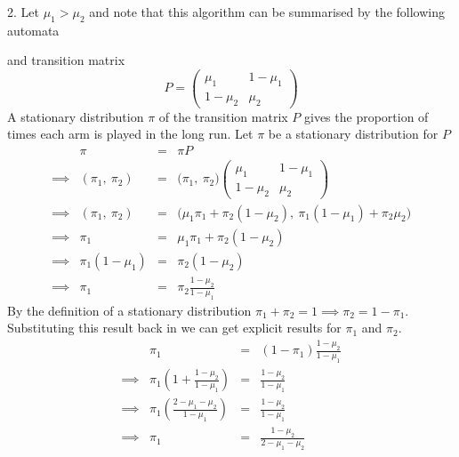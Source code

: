 \documentclass[11pt,a4paper]{article}
\begin{document}
\begin{answer}{2.}
  Let $\mu_1>\mu_2$ and note that this algorithm can be summarised by the following automata
  \begin{center}
  \end{center}
  and transition matrix
  \[ P=\begin{pmatrix}\mu_1&1-\mu_1\\1-\mu_2&\mu_2\end{pmatrix} \]
  A stationary distribution $\pi$ of the transition matrix $P$ gives the proportion of times each arm is played in the long run. Let $\pi$ be a stationary distribution for $P$
  \[\begin{array}{rrcl}
    &\pi&=&\pi P\\
    \implies&(\pi_1,\ \pi_2)&=&\big(\pi_1,\ \pi_2\big)\begin{pmatrix}\mu_1&1-\mu_1\\1-\mu_2&\mu_2\end{pmatrix}\\
    \implies&(\pi_1,\ \pi_2)&=&\big(\mu_1\pi_1+\pi_2(1-\mu_2),\ \pi_1(1-\mu_1)+\pi_2\mu_2\big)\\
    \implies&\pi_1&=&\mu_1\pi_1+\pi_2(1-\mu_2)\\
    \implies&\pi_1(1-\mu_1)&=&\pi_2(1-\mu_2)\\
    \implies&\pi_1&=&\pi_2\frac{1-\mu_2}{1-\mu_1}
  \end{array}\]
  By the definition of a stationary distribution $\pi_1+\pi_2=1\implies\pi_2=1-\pi_1$. Substituting this result back in we can get explicit results for $\pi_1$ and $\pi_2$.
  \[\begin{array}{rrcl}
    &\pi_1&=&(1-\pi_1)\frac{1-\mu_2}{1-\mu_1}\\
    \implies&\pi_1\left(1+\frac{1-\mu_2}{1-\mu_1}\right)&=&\frac{1-\mu_2}{1-\mu_1}\\
    \implies&\pi_1\left(\frac{2-\mu_1-\mu_2}{1-\mu_1}\right)&=&\frac{1-\mu_2}{1-\mu_1}\\
    \implies&\pi_1&=&\frac{1-\mu_2}{2-\mu_1-\mu_2}\\

\end{array}\]
\end{answer}
\end{document}
